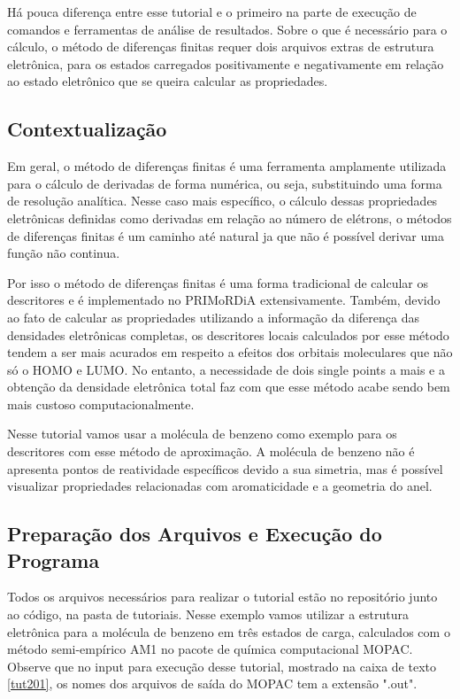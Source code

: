 \documentclass[a4paper,11pt]{refart}
\begin{document}
Há pouca diferença entre esse tutorial e o primeiro na parte de execução de comandos e ferramentas de análise de resultados. Sobre o que é necessário para o cálculo, o método de diferenças finitas requer dois arquivos extras de estrutura eletrônica, para os estados carregados positivamente e negativamente em relação ao estado eletrônico que se queira calcular as propriedades. 


\subsection{Contextualização}

Em geral, o método de diferenças finitas é uma ferramenta amplamente utilizada para o cálculo de derivadas de forma numérica, ou seja, substituindo uma forma de resolução analítica. Nesse caso mais específico, o cálculo dessas propriedades eletrônicas definidas como derivadas em relação ao número de elétrons, o métodos de diferenças finitas é um caminho até natural ja que não é possível derivar uma função não continua. 

Por isso o método de diferenças finitas é uma forma tradicional de calcular os descritores e é implementado no PRIMoRDiA extensivamente. Também, devido ao fato de calcular as propriedades utilizando a informação da diferença das densidades eletrônicas completas, os descritores locais calculados por esse método tendem a ser mais acurados em respeito a efeitos dos orbitais moleculares que não só o HOMO e LUMO. No entanto, a necessidade de dois single points a mais e a obtenção da densidade eletrônica total faz com que esse método acabe sendo bem mais custoso computacionalmente. 

Nesse tutorial vamos usar a molécula de benzeno como exemplo para os descritores com esse método de aproximação. A molécula de benzeno não é apresenta pontos de reatividade específicos devido a sua simetria, mas é possível visualizar propriedades relacionadas com aromaticidade e a geometria do anel. 

\subsection{Preparação dos Arquivos e Execução do Programa}

Todos os arquivos necessários para realizar o tutorial estão no repositório junto ao código, na pasta de tutoriais. Nesse exemplo vamos utilizar a estrutura eletrônica para a molécula de benzeno em três estados de carga, calculados com o método semi-empírico AM1 no pacote de química computacional MOPAC. Observe que no input para execução desse tutorial, mostrado na caixa de texto \autoref{tut201}, os nomes dos arquivos de saída do MOPAC tem a extensão ".out". 
\end{document}
